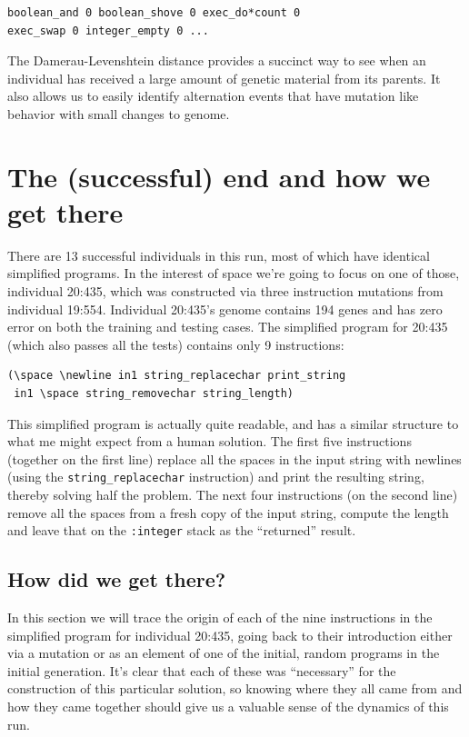 \begin{verbatim}
boolean_and 0 boolean_shove 0 exec_do*count 0 
exec_swap 0 integer_empty 0 ...
\end{verbatim}

The Damerau-Levenshtein distance provides a succinct way to see when an individual has received a
large amount of genetic material from its parents. It also allows us to easily identify alternation
events that have mutation like behavior with small changes to genome.
 
\section{The (successful) end and how we get there}
\label{sec:successfulEnd}

There are 13 successful individuals
in this run, most of which have identical simplified
programs. In the interest of space we're going to focus on one of those, 
individual 20:435, which was constructed via three instruction mutations
from individual 19:554.
Individual 20:435's genome contains 194 genes and has zero error on both
the training and testing cases.
The simplified program for 20:435 (which also passes all the tests)
contains only 9 instructions:
\begin{verbatim}
(\space \newline in1 string_replacechar print_string
 in1 \space string_removechar string_length)
\end{verbatim}
This simplified program is actually quite readable, and has a similar
structure to what me might expect from a human solution.
The first five 
instructions (together on the first line) replace all the spaces in the input string 
with newlines (using the \texttt{string\_replacechar} instruction) and print the 
resulting string, thereby solving half the problem. 
The next four instructions (on the second line) remove all the spaces from
a fresh copy of the input string, compute the length and leave that on the
\texttt{:integer} stack as the ``returned'' result.

\subsection{How did we get there?}
\label{sec:howDidWeGetThere}

In this section we will trace the origin of each of the nine instructions
in the simplified program for individual 20:435,
going back to their introduction either via a mutation or as an element 
of one of the initial, random programs in the initial generation. It's clear
that each of these was ``necessary'' for the construction of this particular
solution, so knowing where they all came from and how they came together
should give us a valuable sense of the dynamics of this run. 

